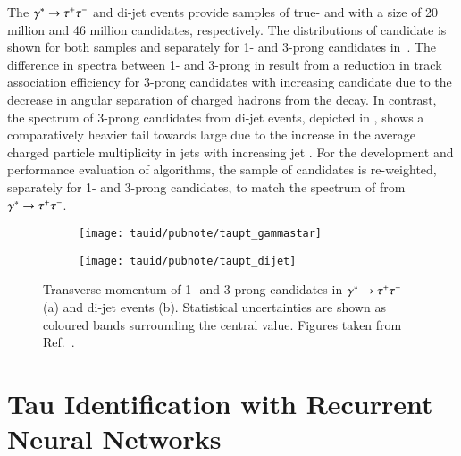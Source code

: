 The $\gamma^{*} \to \tau^{+} \tau^{-}$ and di-jet events provide samples of
true- and \faketauhadvis with a size of 20 million and 46 million
candidates, respectively. The distributions of \tauhadvis candidate
\pT is shown for both samples and separately for 1- and 3-prong
candidates in~. The difference in \pT
spectra between 1- and 3-prong \truetauhadvis in
 result from a reduction in
track association efficiency for 3-prong \tauhadvis candidates with
increasing candidate \pT due to the decrease in angular separation of
charged hadrons from the \taulepton decay. In contrast, the \pT
spectrum of 3-prong \tauhadvis candidates from di-jet events, depicted
in , shows a comparatively heavier
tail towards large \pT due to the increase in the average charged
particle multiplicity in jets with increasing jet \pT. For the
development and performance evaluation of \tauid algorithms, the
sample of \faketauhadvis candidates is re-weighted, separately for 1-
and 3-prong candidates, to match the \pT spectrum of \truetauhadvis
from $\gamma^{*} \to \tau^{+} \tau^{-}$.

\begin{figure}[htbp]
  \begin{subfigure}{0.498\textwidth}
    \texttt{[image: tauid/pubnote/taupt\_gammastar]}
    \label{fig:tauid_candidate_pt_gammastar}
  \end{subfigure}\hfill%
  \begin{subfigure}{0.498\textwidth}
    \texttt{[image: tauid/pubnote/taupt\_dijet]}
    \label{fig:tauid_candidate_pt_dijet}
  \end{subfigure}

  \caption{Transverse momentum of 1- and 3-prong \tauhadvis candidates
    in $\gamma^{*} \to \tau^{+} \tau^{-}$ (a) and di-jet events (b). Statistical
    uncertainties are shown as coloured bands surrounding the central
    value. Figures taken from Ref.~\cite{ATL-PHYS-PUB-2019-033}.}%
  \label{fig:tauid_candidate_pt}
\end{figure}


\section{Tau Identification with Recurrent Neural Networks}%
\label{sec:tauid_rnn}

